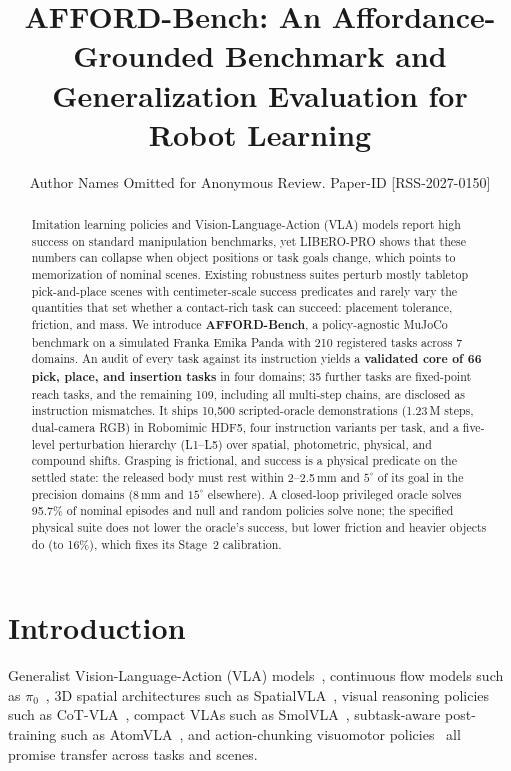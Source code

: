 \documentclass[conference]{IEEEtran}
\begin{document}
\title{AFFORD-Bench: An Affordance-Grounded Benchmark and Generalization Evaluation for Robot Learning}

\author{Author Names Omitted for Anonymous Review. Paper-ID [RSS-2027-0150]}

\maketitle

\begin{abstract}
Imitation learning policies and Vision-Language-Action (VLA) models report high success on standard manipulation benchmarks, yet LIBERO-PRO shows that these numbers can collapse when object positions or task goals change, which points to memorization of nominal scenes. Existing robustness suites perturb mostly tabletop pick-and-place scenes with centimeter-scale success predicates and rarely vary the quantities that set whether a contact-rich task can succeed: placement tolerance, friction, and mass. We introduce \textbf{AFFORD-Bench}, a policy-agnostic MuJoCo benchmark on a simulated Franka Emika Panda with 210 registered tasks across 7 domains. An audit of every task against its instruction yields a \textbf{validated core of 66 pick, place, and insertion tasks} in four domains; 35 further tasks are fixed-point reach tasks, and the remaining 109, including all multi-step chains, are disclosed as instruction mismatches. It ships 10{,}500 scripted-oracle demonstrations (1.23\,M steps, dual-camera RGB) in Robomimic HDF5, four instruction variants per task, and a five-level perturbation hierarchy (L1--L5) over spatial, photometric, physical, and compound shifts. Grasping is frictional, and success is a physical predicate on the settled state: the released body must rest within 2--2.5\,mm and $5^\circ$ of its goal in the precision domains (8\,mm and $15^\circ$ elsewhere). A closed-loop privileged oracle solves 95.7\% of nominal episodes and null and random policies solve none; the specified physical suite does not lower the oracle's success, but lower friction and heavier objects do (to 16\%), which fixes its Stage~2 calibration.
\end{abstract}

\IEEEpeerreviewmaketitle

\section{Introduction}
\label{sec:intro}

Generalist Vision-Language-Action (VLA) models~\cite{kim2024openvla, octo2023, padalkar2023openx}, continuous flow models such as $\pi_0$~\cite{black2024pi0}, 3D spatial architectures such as SpatialVLA~\cite{qu2024spatialvla}, visual reasoning policies such as CoT-VLA~\cite{zhao2025cotvla}, compact VLAs such as SmolVLA~\cite{smolvla2025}, subtask-aware post-training such as AtomVLA~\cite{atomvla2025}, and action-chunking visuomotor policies~\cite{chi2023diffusion, zhao2023act} all promise transfer across tasks and scenes.
\end{document}
